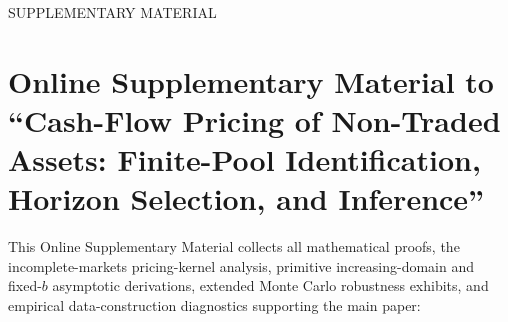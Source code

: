 \appendix

{
\noindent\large
{SUPPLEMENTARY MATERIAL}
}

\section*{Online Supplementary Material to ``Cash-Flow Pricing of Non-Traded Assets: Finite-Pool Identification, Horizon Selection, and Inference''}

This Online Supplementary Material collects all mathematical proofs, the incomplete-markets pricing-kernel analysis, primitive increasing-domain and fixed-$b$ asymptotic derivations, extended Monte Carlo robustness exhibits, and empirical data-construction diagnostics supporting the main paper:
